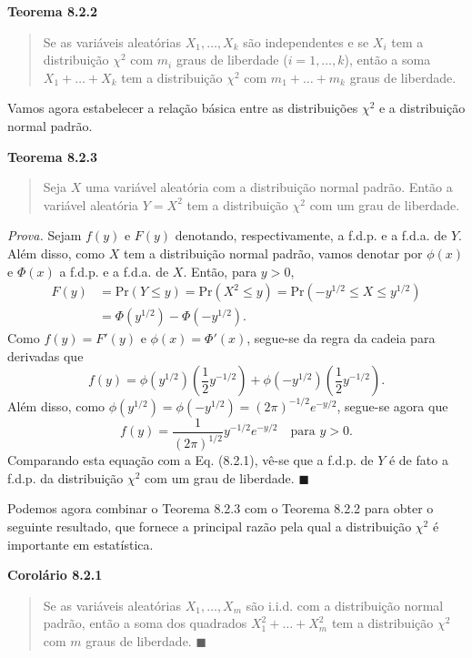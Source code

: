 \vspace{1em}
\noindent\textbf{Teorema 8.2.2}
\begin{quote}
    Se as variáveis aleatórias $X_1, \dots, X_k$ são independentes e se $X_i$ tem a distribuição $\chi^2$ com $m_i$ graus de liberdade ($i=1, \dots, k$), então a soma $X_1 + \dots + X_k$ tem a distribuição $\chi^2$ com $m_1 + \dots + m_k$ graus de liberdade.
\end{quote}
\vspace{1em}

Vamos agora estabelecer a relação básica entre as distribuições $\chi^2$ e a distribuição normal padrão.

\vspace{1em}
\noindent\textbf{Teorema 8.2.3}
\begin{quote}
    Seja $X$ uma variável aleatória com a distribuição normal padrão. Então a variável aleatória $Y = X^2$ tem a distribuição $\chi^2$ com um grau de liberdade.
\end{quote}
\vspace{1em}

\noindent\textit{Prova.} Sejam $f(y)$ e $F(y)$ denotando, respectivamente, a f.d.p. e a f.d.a. de $Y$. Além disso, como $X$ tem a distribuição normal padrão, vamos denotar por $\phi(x)$ e $\Phi(x)$ a f.d.p. e a f.d.a. de $X$. Então, para $y > 0$,
\begin{align*}
    F(y) &= \text{Pr}(Y \le y) = \text{Pr}(X^2 \le y) = \text{Pr}(-y^{1/2} \le X \le y^{1/2}) \\
    &= \Phi(y^{1/2}) - \Phi(-y^{1/2}).
\end{align*}
Como $f(y) = F'(y)$ e $\phi(x) = \Phi'(x)$, segue-se da regra da cadeia para derivadas que
$$
f(y) = \phi(y^{1/2})\left(\frac{1}{2}y^{-1/2}\right) + \phi(-y^{1/2})\left(\frac{1}{2}y^{-1/2}\right).
$$
Além disso, como $\phi(y^{1/2}) = \phi(-y^{1/2}) = (2\pi)^{-1/2}e^{-y/2}$, segue-se agora que
$$
f(y) = \frac{1}{(2\pi)^{1/2}}y^{-1/2}e^{-y/2} \quad \text{para } y > 0.
$$
Comparando esta equação com a Eq. (8.2.1), vê-se que a f.d.p. de $Y$ é de fato a f.d.p. da distribuição $\chi^2$ com um grau de liberdade. \hfill $\blacksquare$

\vspace{1em}
Podemos agora combinar o Teorema 8.2.3 com o Teorema 8.2.2 para obter o seguinte resultado, que fornece a principal razão pela qual a distribuição $\chi^2$ é importante em estatística.
\vspace{1em}

\noindent\textbf{Corolário 8.2.1}
\begin{quote}
    Se as variáveis aleatórias $X_1, \dots, X_m$ são i.i.d. com a distribuição normal padrão, então a soma dos quadrados $X_1^2 + \dots + X_m^2$ tem a distribuição $\chi^2$ com $m$ graus de liberdade. \hfill $\blacksquare$
\end{quote}

